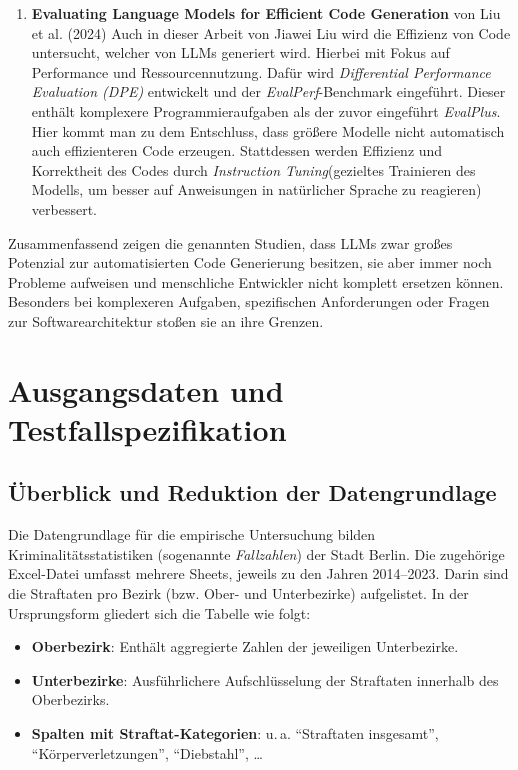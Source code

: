 \documentclass[11pt,a4paper]{article}
\begin{document}
\begin{enumerate}
    \item \textbf{Evaluating Language Models for Efficient Code Generation} von Liu et al. (2024) \cite{liu2024evaluating}
    Auch in dieser Arbeit von Jiawei Liu wird die Effizienz von Code untersucht, welcher von LLMs generiert wird. Hierbei mit Fokus auf Performance und Ressourcennutzung. Dafür wird \emph{Differential Performance Evaluation (DPE)} entwickelt und der \emph{EvalPerf}-Benchmark eingeführt. Dieser enthält komplexere Programmieraufgaben als der zuvor eingeführt \emph{EvalPlus}. Hier kommt man zu dem Entschluss, dass größere Modelle nicht automatisch auch effizienteren Code erzeugen. Stattdessen werden Effizienz und Korrektheit des Codes durch \emph{Instruction Tuning}(gezieltes Trainieren des Modells, um besser auf Anweisungen in natürlicher Sprache zu reagieren) verbessert.
\end{enumerate}
Zusammenfassend zeigen die genannten Studien, dass LLMs zwar großes Potenzial zur automatisierten Code Generierung besitzen, sie aber immer noch Probleme aufweisen und menschliche Entwickler nicht komplett ersetzen können. Besonders bei komplexeren Aufgaben, spezifischen Anforderungen oder Fragen zur Softwarearchitektur stoßen sie an ihre Grenzen.

\section{Ausgangsdaten und Testfallspezifikation}
\subsection{Überblick und Reduktion der Datengrundlage}
Die Datengrundlage für die empirische Untersuchung bilden Kriminalitätsstatistiken (sogenannte \emph{Fallzahlen}) der Stadt Berlin\cite{opendataberlin}. Die zugehörige Excel-Datei umfasst mehrere Sheets, jeweils zu den Jahren 2014--2023. Darin sind die Straftaten pro Bezirk (bzw. Ober- und Unterbezirke) aufgelistet. In der Ursprungsform gliedert sich die Tabelle wie folgt:
\begin{itemize}
    \item \textbf{Oberbezirk}: Enthält aggregierte Zahlen der jeweiligen Unterbezirke.
    \item \textbf{Unterbezirke}: Ausführlichere Aufschlüsselung der Straftaten innerhalb des Oberbezirks.
    \item \textbf{Spalten mit Straftat-Kategorien}: u.\,a. \enquote{Straftaten insgesamt}, \enquote{Körperverletzungen}, \enquote{Diebstahl}, \dots
\end{itemize}
\end{document}
